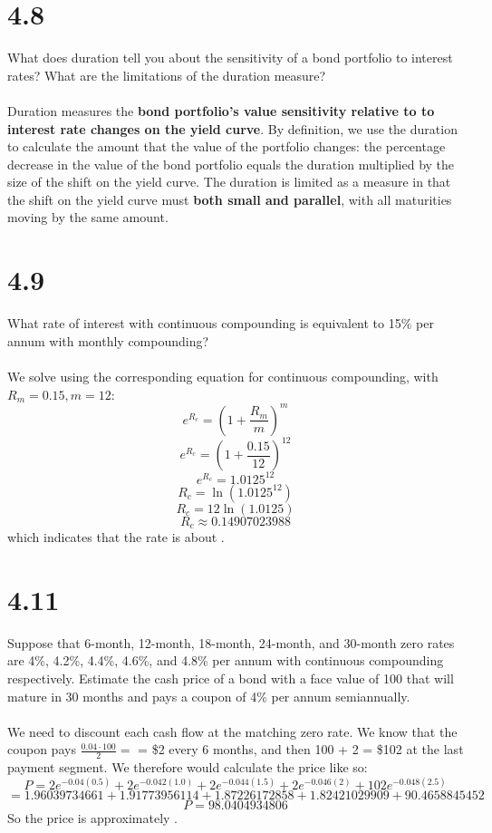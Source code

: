 \documentclass{article}
\begin{document}
{\Large 

\section*{4.8}

What does duration tell you about the sensitivity of a bond portfolio to interest rates? What are the limitations of the duration measure? \\ \\ 
Duration measures the \textbf{bond portfolio's value sensitivity relative to to interest rate changes on the yield curve}. By definition, we use the duration to calculate the amount that the value of the portfolio changes: the percentage decrease in the value of the bond portfolio equals the duration multiplied by the size of the shift on the yield curve. The duration is limited as a measure in that the shift on the yield curve must \textbf{both small and parallel}, with all maturities moving by the same amount. 

}
{\Large 

\section*{4.9}

What rate of interest with continuous compounding is equivalent to 15\% per annum with monthly compounding? \\ \\ 
We solve using the corresponding equation for continuous compounding, with \(R_m = 0.15, m = 12\):
\[
  e^{R_c} = (1 + \frac{R_m}{m})^m
\]
\[
  e^{R_c} = (1 + \frac{0.15}{12})^{12}
\]
\[
  e^{R_c} = 1.0125^{12}
\]
\[
  R_c = \ln(1.0125^{12})
\]
\[
  R_c = 12 \ln(1.0125)
\]
\[
  R_c \approx 0.14907023988
\]
which indicates that the rate is about .


}
{\Large 

\section*{4.11}

Suppose that 6-month, 12-month, 18-month, 24-month, and 30-month zero rates are 4\%, 4.2\%, 4.4\%, 4.6\%, and 4.8\% per annum with continuous compounding respectively. Estimate the cash price of a bond with a face value of 100 that will mature in 30 months and pays a coupon of 4\% per annum semiannually. \\ \\
We need to discount each cash flow at the matching zero rate. We know that the coupon pays \(\frac{0.04 \cdot 100}{2} = \) = \$2 every 6 months, and then 100 + 2 = \$102 at the last payment segment. We therefore would calculate the price like so:
\[
  P = 2e^{-0.04(0.5)} + 2e^{-0.042(1.0)} + 2e^{-0.044(1.5)} + 2e^{-0.046(2)} + 102e^{-0.048(2.5)}
\]
\[
  = 1.96039734661 + 1.91773956114 + 1.87226172858 + 1.82421029909 + 90.4658845452
\]
\[
  P = 98.0404934806
\]
So the price is approximately .

}
\end{document}
